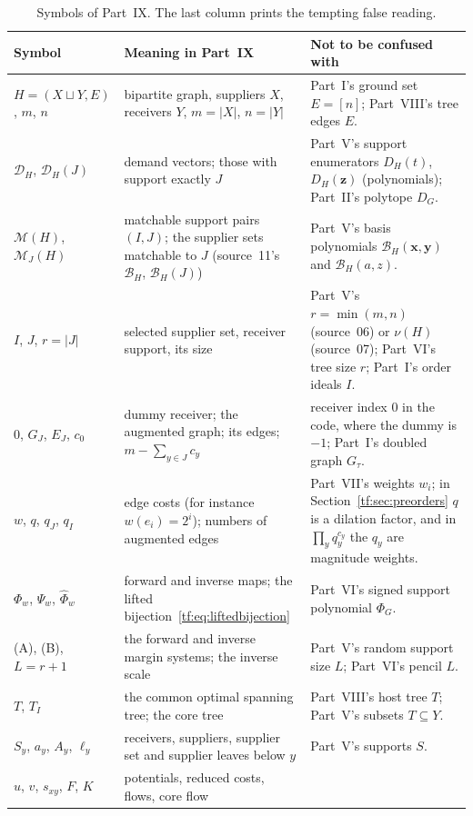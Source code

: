 \documentclass[11pt]{article}
\numberwithin{equation}{section}
\theoremstyle{definition}
\newcommand{\PM}{\mathcal M}
\newcommand{\cD}{\mathcal D}
\newcommand{\cB}{\mathcal B}
\begin{document}
\begin{table}[tbp]
\centering\footnotesize
\caption{Symbols of Part~IX. The last column prints the tempting false
reading.}
\label{tf:tab:notation}
\begin{tabularx}{\textwidth}{@{}>{\raggedright}p{}>{\raggedright}p{}Y@{}}
\toprule
Symbol & Meaning in Part~IX & Not to be confused with\\
\midrule
$H=(X\sqcup Y,E)$, $m$, $n$ & bipartite graph, suppliers $X$, receivers
 $Y$, $m=|X|$, $n=|Y|$ & Part~I's ground set $E=[n]$; Part~VIII's tree
 edges $E$.\\
$\cD_H$, $\cD_H(J)$ & demand vectors; those with support exactly $J$ &
 Part~V's support enumerators $D_H(t)$, $D_H(\mathbf z)$ (polynomials);
 Part~II's polytope $D_G$.\\
$\PM(H)$, $\PM_J(H)$ & matchable support pairs $(I,J)$; the supplier sets
 matchable to $J$ (source~11's $\mathcal B_H$, $\mathcal B_H(J)$) &
 Part~V's basis polynomials $\cB_H(\mathbf x,\mathbf y)$ and
 $\mathcal B_H(a,z)$.\\
$I$, $J$, $r=|J|$ & selected supplier set, receiver support, its size &
 Part~V's $r=\min(m,n)$ (source~06) or $\nu(H)$ (source~07); Part~VI's
 tree size $r$; Part~I's order ideals $I$.\\
$0$, $G_J$, $E_J$, $c_0$ & dummy receiver; the augmented graph; its
 edges; $m-\sum_{y\in J}c_y$ & receiver index $0$ in the code, where the
 dummy is $-1$; Part~I's doubled graph $G_\tau$.\\
$w$, $q$, $q_J$, $q_I$ & edge costs (for instance $w(e_i)=2^i$); numbers
 of augmented edges & Part~VII's weights $w_i$; in
 Section~\ref{tf:sec:preorders} $q$ is a dilation factor, and in
 $\prod_yq_y^{c_y}$ the $q_y$ are magnitude weights.\\
$\Phi_w$, $\Psi_w$, $\widehat\Phi_w$ & forward and inverse maps; the
 lifted bijection~\eqref{tf:eq:liftedbijection} & Part~VI's signed support
 polynomial $\Phi_G$.\\
(A), (B), $L=r+1$ & the forward and inverse margin systems; the inverse
 scale & Part~V's random support size $L$; Part~VI's pencil $L$.\\
$T$, $T_I$ & the common optimal spanning tree; the core tree & Part~VIII's
 host tree $T$; Part~V's subsets $T\subseteq Y$.\\
$S_y$, $a_y$, $A_y$, $\ell_y$ & receivers, suppliers, supplier set and
 supplier leaves below $y$ & Part~V's supports $S$.\\
$u$, $v$, $s_{xy}$, $F$, $K$ & potentials, reduced costs, flows, core flow

\end{tabularx}
\end{table}
\end{document}
